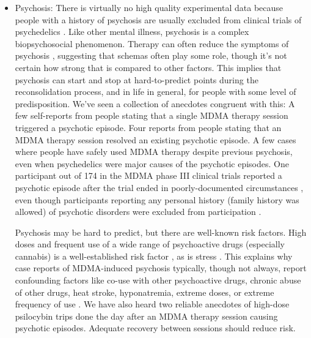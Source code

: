 \documentclass[12pt,letterpaper]{book}
\begin{document}
\begin{itemize}
    \item Psychosis: There is virtually no high quality experimental data because people with a history of psychosis are usually excluded from clinical trials of psychedelics \cite{la2022Psychosis}. Like other mental illness, psychosis is a complex biopsychosocial phenomenon. Therapy can often reduce the symptoms of psychosis \cite{CBTp}, suggesting that schemas often play some role, though it's not certain how strong that is compared to other factors. This implies that psychosis can start and stop at hard-to-predict points during the reconsolidation process, and in life in general, for people with some level of predisposition. We've seen a collection of anecdotes congruent with this: A few self-reports from people stating that a single MDMA therapy session triggered a psychotic episode. Four reports from people stating that an MDMA therapy session resolved an existing psychotic episode. A few cases where people have safely used MDMA therapy despite previous psychosis, even when psychedelics were major causes of the psychotic episodes. One participant out of 174 in the MDMA phase III clinical trials reported a psychotic episode after the trial ended in poorly-documented circumstances \cite{powerTrip}, even though participants reporting any personal history (family history was allowed) of psychotic disorders were excluded from participation \cite{smithSystematic,mitchellMDMAClinicalTrial2}.

    Psychosis may be hard to predict, but there are well-known risk factors. High doses and frequent use of a wide range of psychoactive drugs (especially cannabis) is a well-established risk factor \cite{drugsPsychosis}, as is stress \cite{winkelPsychosisStress}. This explains why case reports of MDMA-induced psychosis typically, though not always, report confounding factors like co-use with other psychoactive drugs, chronic abuse of other drugs, heat stroke, hyponatremia, extreme doses, or extreme frequency of use \cite{psychosisTreatment,arnovitzSchizophrenia,mcguirePsychosis,patelPsychosis,vaivaPsychosis}. We have also heard two reliable anecdotes of high-dose psilocybin trips done the day after an MDMA therapy session causing psychotic episodes. Adequate recovery between sessions should reduce risk.


\end{itemize}
\end{document}
